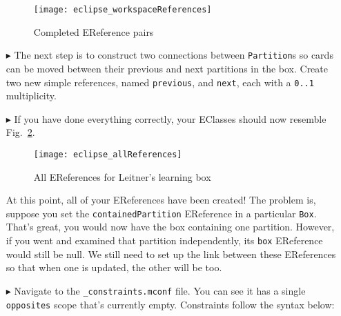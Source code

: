 \begin{itemize}
\begin{figure}[htbp]
	\centering
  \texttt{[image: eclipse\_workspaceReferences]}
	\caption{Completed EReference pairs}
	\label{fig:almostAllReferences}
\end{figure} 

\newpage

\item[$\blacktriangleright$] The next step is to construct two connections between \texttt{Partition}s so cards can be moved between their previous and next
partitions in the box. Create two new simple references, named \texttt{previous}, and \texttt{next}, each with a \texttt{0..1} multiplicity.

\vspace{0.5cm}

\item[$\blacktriangleright$] If you have done everything correctly, your EClasses should now resemble Fig.~\ref{fig:allReferences}. 

\vspace{0.5cm}

\begin{figure}[htbp]
	\centering
  \texttt{[image: eclipse\_allReferences]}
	\caption{All EReferences for Leitner's learning box}
	\label{fig:allReferences}
\end{figure} 

\clearpage

At this point, all of your EReferences have been created! The problem is, suppose you set the \texttt{containedPartition} EReference in a particular
\texttt{Box}. That's great, you would now have the box containing one partition. However, if you went and examined that partition independently, its
\texttt{box} EReference would still be null. We still need to set up the link between these EReferences so that when one is updated, the other will be too.

\vspace{0.5cm}

\item[$\blacktriangleright$] Navigate to the \texttt{\_constraints.mconf} file. You can see it has a single \texttt{opposites} scope that's currently empty.
Constraints follow the syntax below: 



\end{itemize}

